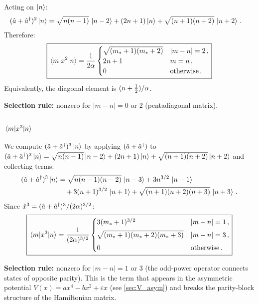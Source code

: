 Acting on $\ket{n}$:
\begin{align}
  (\hat{a}+\hat{a}^{\dagger})^2\ket{n}
  &= \sqrt{n(n-1)}\,\ket{n-2} + (2n+1)\ket{n} + \sqrt{(n+1)(n+2)}\,\ket{n+2}\,.
\end{align}
Therefore:
\begin{equation}\label{eq:x2_HO}
  \boxed{\mel{m}{x^2}{n} = \frac{1}{2\alpha}
  \begin{cases}
    \sqrt{(m_*+1)(m_*+2)} & |m-n| = 2\,,\\
    2n+1 & m = n\,,\\
    0 & \text{otherwise}\,.
  \end{cases}}
\end{equation}
Equivalently, the diagonal element is $(n+\tfrac{1}{2})/\alpha$.

\textbf{Selection rule:} nonzero for $|m-n| = 0$ or $2$ (pentadiagonal matrix).

\subsubsection{$\mel{m}{x^3}{n}$}

We compute $(\hat{a}+\hat{a}^{\dagger})^3\ket{n}$ by applying $(\hat{a}+\hat{a}^{\dagger})$ to
$(\hat{a}+\hat{a}^{\dagger})^2\ket{n} = \sqrt{n(n-1)}\ket{n-2}+(2n+1)\ket{n}+\sqrt{(n+1)(n+2)}\ket{n+2}$
and collecting terms:
\begin{align}
  (\hat{a}+\hat{a}^{\dagger})^3\ket{n}
  &= \sqrt{n(n-1)(n-2)}\,\ket{n-3} + 3n^{3/2}\,\ket{n-1}\notag\\
  &\quad + 3(n+1)^{3/2}\,\ket{n+1} + \sqrt{(n+1)(n+2)(n+3)}\,\ket{n+3}\,.
\end{align}
Since $\hat{x}^3 = (\hat{a}+\hat{a}^{\dagger})^3/(2\alpha)^{3/2}$:
\begin{equation}\label{eq:x3_HO}
  \boxed{\mel{m}{x^3}{n} = \frac{1}{(2\alpha)^{3/2}}
  \begin{cases}
    3(m_*+1)^{3/2} & |m-n| = 1\,,\\[4pt]
    \sqrt{(m_*+1)(m_*+2)(m_*+3)} & |m-n| = 3\,,\\[4pt]
    0 & \text{otherwise}\,.
  \end{cases}}
\end{equation}

\textbf{Selection rule:} nonzero for $|m-n| = 1$ or $3$ (the odd-power operator
connects states of opposite parity). This is the term that appears in the
asymmetric potential $V(x) = ax^4 - bx^2 + \varepsilon x$ (see \cref{sec:V_asym})
and breaks the parity-block structure of the Hamiltonian matrix.

